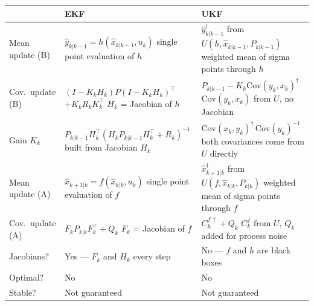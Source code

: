 \documentclass[12pt, a4paper]{article}
\begin{document}
\begin{center}
\renewcommand{\arraystretch}{1.8}
\begin{tabular}{p{2.8cm} p{5.0cm} p{5.0cm}}
  \toprule
  & \textbf{EKF} & \textbf{UKF} \\
  \midrule
  Mean update (B) &
    $\hat{y}_{k|k-1} = h(\hat{x}_{k|k-1}, u_k)$\newline
    {\footnotesize single point evaluation of $h$} &
    $\hat{y}_{k|k-1}^\dagger$ from $U(h, \hat{x}_{k|k-1}, P_{k|k-1})$\newline
    {\footnotesize weighted mean of sigma points through $h$} \\
  Cov.\ update (B) &
    $(I{-}K_k H_k)P(I{-}K_k H_k)^\top$\newline${+}K_k R_k K_k^\top$\newline
    {\footnotesize $H_k$ = Jacobian of $h$} &
    $P_{k|k-1} - K_k \mathrm{Cov}(y_k, x_k)^\dagger$\newline
    {\footnotesize $\mathrm{Cov}(y_k, x_k)$ from $U$, no Jacobian} \\
  Gain $K_k$ &
    $P_{k|k-1} H_k^\top (H_k P_{k|k-1} H_k^\top + R_k)^{-1}$\newline
    {\footnotesize built from Jacobian $H_k$} &
    $\mathrm{Cov}(x_k, y_k)^\dagger\,\mathrm{Cov}(y_k)^{-1}$\newline
    {\footnotesize both covariances come from $U$ directly} \\
  Mean update (A) &
    $\hat{x}_{k+1|k} = f(\hat{x}_{k|k}, u_k)$\newline
    {\footnotesize single point evaluation of $f$} &
    $\hat{x}_{k+1|k}^\dagger$ from $U(f, \hat{x}_{k|k}, P_{k|k})$\newline
    {\footnotesize weighted mean of sigma points through $f$} \\
  Cov.\ update (A) &
    $F_k P_{k|k} F_k^\top + Q_k$\newline
    {\footnotesize $F_k$ = Jacobian of $f$} &
    $C_k^{f\,\dagger} + Q_k$\newline
    {\footnotesize $C_k^f$ from $U$, $Q_k$ added for process noise} \\
  Jacobians? &
    Yes --- $F_k$ and $H_k$ every step &
    No --- $f$ and $h$ are black boxes \\
  Optimal? & No & No \\
  Stable? & Not guaranteed & Not guaranteed \\
  \bottomrule
\end{tabular}
\end{center}
\end{document}

